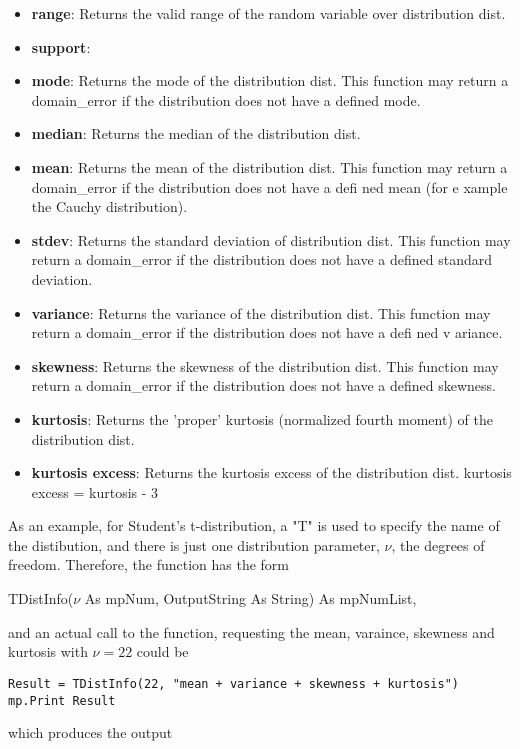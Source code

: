\begin{itemize}
	\item \textbf{range}: Returns the valid range of the random variable over distribution dist. 
	\item \textbf{support}: 	
	\item \textbf{mode}: Returns the mode of the distribution dist. This function may return a domain\_error if the distribution does not have a defined mode.
	\item \textbf{median}: Returns the median of the distribution dist.
	\item \textbf{mean}: Returns the mean of the distribution dist. This function may return a domain\_error if the distribution does not have a defi ned mean (for e xample the Cauchy distribution).
	\item \textbf{stdev}: Returns the standard deviation of distribution dist.
	This function may return a domain\_error if the distribution does not have a defined standard deviation.
	\item \textbf{variance}: Returns the variance of the distribution dist.
	This function may return a domain\_error if the distribution does not have a defi ned v ariance.
	\item \textbf{skewness}: Returns the skewness of the distribution dist.
	This function may return a domain\_error if the distribution does not have a defined skewness.
	\item \textbf{kurtosis}: Returns the 'proper' kurtosis (normalized fourth moment) of the distribution dist.
	\item \textbf{kurtosis excess}: Returns the kurtosis excess of the distribution dist. kurtosis excess = kurtosis - 3
\end{itemize}



\vspace{0.3cm}
As an example, for Student's t-distribution, a "T" is used to specify the name of the distibution, and there is just one distribution parameter, $\nu$, the degrees of freedom. Therefore,  the function has the form

\vspace{0.3cm}
\textsf{TDistInfo($\nu$ As mpNum, OutputString As String) As mpNumList}, 

\vspace{0.3cm}
and an actual call to the function, requesting the mean, varaince, skewness and kurtosis with $\nu=22$ could be

\begin{lstlisting}
Result = TDistInfo(22, "mean + variance + skewness + kurtosis")
mp.Print Result
\end{lstlisting}
which produces the output

